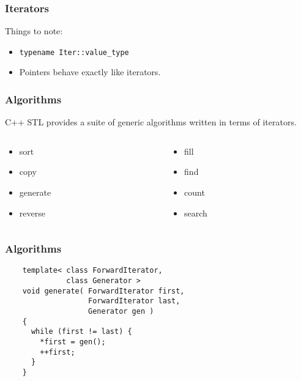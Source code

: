 \begin{frame}[fragile]
  \frametitle{Iterators}
  Things to note:
  \begin{itemize}
    \item \lstinline|typename Iter::value_type|
    \item Pointers behave exactly like iterators.
  \end{itemize}
\end{frame}

\begin{frame}
  \frametitle{Algorithms}
  C++ STL provides a suite of generic algorithms written in
  terms of iterators.
  \begin{columns}
    \begin{column}{.5\textwidth}
      \begin{itemize}
      \item sort
      \item copy
      \item generate
      \item reverse
      \end{itemize}
    \end{column}
    \begin{column}{.5\textwidth}
      \begin{itemize}
      \item fill
      \item find
      \item count
      \item search
      \end{itemize}
    \end{column}
  \end{columns}
\end{frame}

\begin{frame}[fragile]
  \frametitle{Algorithms}
  \begin{example}
    \begin{lstlisting}
    template< class ForwardIterator,
              class Generator >
    void generate( ForwardIterator first,
                   ForwardIterator last,
                   Generator gen )
    {
      while (first != last) {
        *first = gen();
        ++first;
      }
    }
    \end{lstlisting}
  \end{example}
\end{frame}

